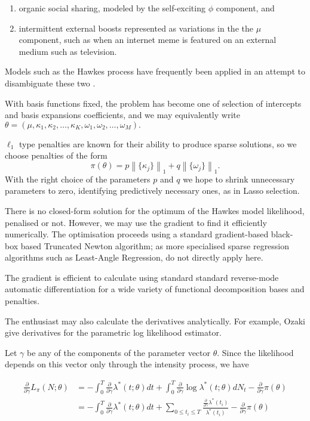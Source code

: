 \documentclass[11pt]{article}
\providecommand{\tightlist}{%
      \setlength{\itemsep}{0pt}\setlength{\parskip}{0pt}}
\begin{document}
\begin{enumerate}
\def\labelenumi{\arabic{enumi}.}
\tightlist
\item
  organic social sharing, modeled by the self-exciting \(\phi\)
  component, and
\item
  intermittent external boosts represented as variations in the the
  \(\mu\) component, such as when an internet meme is featured on an
  external medium such as television.
\end{enumerate}

Models such as the Hawkes process have frequently been applied in an
attempt to disambiguate these two
\cite{crane_robust_2008,mitchell_hawkes_2010,rizoiu_expecting_2017}.

    With basis functions fixed, the problem has become one of selection of
intercepts and basis expansions coefficients, and we may equivalently
write
\(\theta=(\mu, \kappa_1,\kappa_2,\dots,\kappa_K,\omega_1, \omega_2,\dots,\omega_M).\)

\(\ell_1\) type penalties are known for their ability to produce sparse
solutions, so we choose penalties of the form
\[\pi(\theta)=p\left\|\{\kappa_j\}\right\|_1+q\left\|\{\omega_j\}\right\|_1.\]
With the right choice of the parameters \(p\) and \(q\) we hope to
shrink unnecessary parameters to zero, identifying predictively
necessary ones, as in Lasso selection.

    There is no closed-form solution for the optimum of the Hawkes model
likelihood, penalised or not. However, we may use the gradient to find
it efficiently numerically. The optimisation proceeds using a standard
gradient-based black-box based Truncated Newton algorithm; as more
specialised sparse regression algorithms such as Least-Angle Regression,
do not directly apply here.

The gradient is efficient to calculate using standard standard
reverse-mode automatic differentiation \cite{baydin_automatic_2014} for
a wide variety of functional decomposition bases and penalties.

The enthusiast may also calculate the derivatives analytically. For
example, Ozaki \cite{ozaki_maximum_1979} give derivatives for the
parametric log likelihood estimator.

    Let \(\gamma\) be any of the components of the parameter vector
\(\theta\). Since the likelihood depends on this vector only through the
intensity process, we have

\[\begin{aligned}
{ \scriptstyle \frac{\partial}{\partial\gamma} } L_\pi(N;\theta)&=-\int_0^T{ \scriptstyle \frac{\partial}{\partial\gamma} }\lambda^*(t;\theta)dt + \int_0^T { \scriptstyle \frac{\partial}{\partial\gamma} }\log \lambda^*(t;\theta) dN_t -{ \scriptstyle \frac{\partial}{\partial\gamma} }\pi(\theta) \\
&=-\int_0^T{ \scriptstyle \frac{\partial}{\partial\gamma} }\lambda^*(t;\theta)dt + \sum_{0\leq t_i\leq T} \frac{{ \scriptstyle \frac{\partial}{\partial\gamma} }\lambda^*(t_i)}{\lambda^*(t_i)} -{ \scriptstyle \frac{\partial}{\partial\gamma} }\pi(\theta)
\end{aligned}
\]
\end{document}
